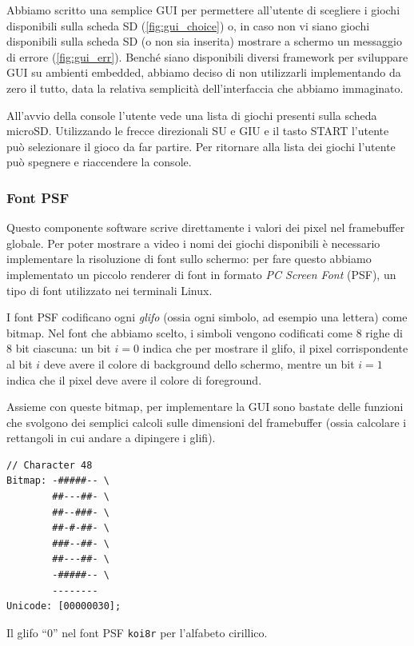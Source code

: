 \documentclass[hidelinks,12pt]{article}
\begin{document}
Abbiamo scritto una semplice GUI per permettere all'utente di scegliere i giochi
disponibili sulla scheda SD (\cref{fig:gui_choice}) o, in caso non vi siano
giochi disponibili sulla scheda SD (o non sia inserita) mostrare a schermo un
messaggio di errore (\cref{fig:gui_err}).
Benché siano disponibili diversi framework per sviluppare GUI su ambienti
embedded, abbiamo deciso di non utilizzarli implementando da zero il tutto, data
la relativa semplicità dell'interfaccia che abbiamo immaginato.

All'avvio della console l'utente vede una lista di giochi presenti sulla scheda
microSD. Utilizzando le frecce direzionali SU e GIU e il tasto START l'utente
può selezionare il gioco da far partire. Per ritornare alla lista dei giochi
l'utente può spegnere e riaccendere la console.

\subsubsection{Font PSF}
Questo componente software scrive direttamente i valori dei pixel nel
framebuffer globale. Per poter mostrare a video i nomi dei giochi disponibili è
necessario implementare la risoluzione di font sullo schermo: per fare questo
abbiamo implementato un piccolo renderer di font in formato
\textit{PC Screen Font} (PSF), un tipo di font utilizzato nei terminali Linux.

I font PSF codificano ogni \textit{glifo} (ossia ogni simbolo, ad esempio una
lettera) come bitmap. Nel font che abbiamo scelto, i simboli vengono codificati
come $8$ righe di $8$ bit ciascuna:
un bit $i = 0$ indica che per mostrare il glifo, il pixel corrispondente al
bit $i$ deve avere il colore di background dello schermo, mentre un bit $i = 1$
indica che il pixel deve avere il colore di foreground.

Assieme con queste bitmap, per implementare la GUI sono bastate delle funzioni
che svolgono dei semplici calcoli sulle dimensioni del framebuffer (ossia
calcolare i rettangoli in cui andare a dipingere i glifi).
\begin{table}[h]
	\begin{verbatim}
// Character 48
Bitmap: -#####-- \
        ##---##- \
        ##--###- \
        ##-#-##- \
        ###--##- \
        ##---##- \
        -#####-- \
        --------
Unicode: [00000030];
	\end{verbatim}
	\caption{Il glifo ``0'' nel font PSF \texttt{koi8r} per l'alfabeto cirillico.}
\end{table}
\end{document}
